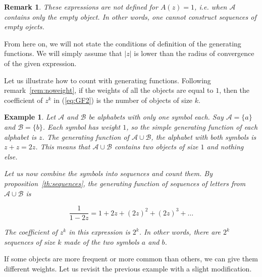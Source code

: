 \documentclass{article}
\newtheorem{example}{Example}
\newtheorem{remark}{Remark}
\begin{document}
\begin{remark}
These expressions are not defined for $A(z) = 1$, \textit{i.e.} when
$\mathcal{A}$ contains only the empty object. In other words, one cannot
construct sequences of empty ojects.
\end{remark}

From here on, we will not state the conditions of definition of the
generating functions. We will simply assume that $|z|$ is lower than the
radius of convergence of the given expression.

Let us illustrate how to count with generating functions. Following
remark~\ref{rem:noweight}, if the weights of all the objects are equal to
$1$, then the coefficient of $z^k$ in (\ref{eq:GF2}) is the number of
objects of size $k$.

\begin{example}
\label{ex:noweight}
Let $\mathcal{A}$ and $\mathcal{B}$ be alphabets with only one symbol
each. Say $\mathcal{A} = \{a\}$ and $\mathcal{B} = \{b\}$. Each symbol
has weight $1$, so the simple generating function of each alphabet is $z$.
The generating function of $\mathcal{A} \cup \mathcal{B}$, the alphabet
with both symbols is $z+z = 2z$. This means that $\mathcal{A} \cup
\mathcal{B}$ contains two objects of size $1$ and nothing else.

Let us now combine the symbols into sequences and count them. By
proposition~\ref{th:sequences}, the generating function of sequences of
letters from $\mathcal{A} \cup \mathcal{B}$ is

\begin{equation*}
\frac{1}{1-2z} = 1 + 2z + (2z)^2 + (2z)^3 + \ldots
\end{equation*}

The coefficient of $z^k$ in this expression is $2^k$. In other words,
there are $2^k$ sequences of size $k$ made of the two symbols $a$ and $b$.
\end{example}

If some objects are more frequent or more common than others, we can give
them different weights. Let us revisit the previous example with a slight
modification.
\end{document}
